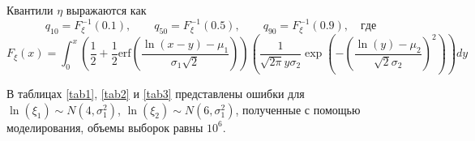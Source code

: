 \documentclass[12pt]{article}
\begin{document}
	Квантили $\eta$ выражаются как
	\[q_{10} = F_{\xi}^{-1}(0.1), \quad\quad q_{50} = F_{\xi}^{-1}(0.5), \quad\quad q_{90} = F_{\xi}^{-1}(0.9), \quad где\]
	\[F_{\xi}(x) = \int_{0}^{x}\left( \dfrac{1}{2}+\dfrac{1}{2} \mathrm{erf}\left( \dfrac{\ln(x-y)-\mu_{1}}{\sigma_{1}\sqrt{2}}\right) \right) \left( \dfrac{1}{\sqrt{2\pi}y\sigma_{2}}\exp\left( -\left( \dfrac{\ln(y)-\mu_{2}}{\sqrt{2}\sigma_{2}}\right) ^{2}\right) \right) dy \]
	
	В таблицах \ref{tab1}, \ref{tab2} и \ref{tab3} представлены ошибки для $\ln(\xi_{1}) \sim N(4, \sigma _{1}^{2})$, $\ln(\xi_{2}) \sim N(6, \sigma _{1}^{2})$, полученные с помощью моделирования, объемы выборок равны $10^{6}$.
	
	
\end{document}
